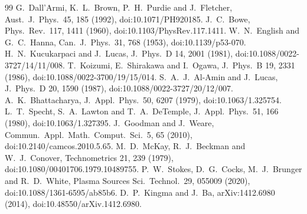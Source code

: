 \documentclass[11pt]{article}
\begin{document}
\begin{thebibliography}{99}
 G.~Dall'Armi, K.~L.~Brown, P.~H.~Purdie and J.~Fletcher, Aust.\ J.\ Phys.\ 45, 185 (1992), doi:10.1071/PH920185.
 J.~C.~Bowe, Phys.\ Rev.\ 117, 1411 (1960), doi:10.1103/PhysRev.117.1411.
 W.~N.~English and G.~C.~Hanna, Can.\ J.\ Phys.\ 31, 768 (1953), doi:10.1139/p53-070.
 H.~N.~Kucukarpaci and J.~Lucas, J.\ Phys.\ D 14, 2001 (1981), doi:10.1088/0022-3727/14/11/008.
 T.~Koizumi, E.~Shirakawa and I.~Ogawa, J.\ Phys.\ B 19, 2331 (1986), doi:10.1088/0022-3700/19/15/014.
 S.~A.~J.~Al-Amin and J.~Lucas, J.\ Phys.\ D 20, 1590 (1987), doi:10.1088/0022-3727/20/12/007.
 A.~K.~Bhattacharya, J.\ Appl.\ Phys.\ 50, 6207 (1979), doi:10.1063/1.325754.
 L.~T.~Specht, S.~A.~Lawton and T.~A.~DeTemple, J.\ Appl.\ Phys.\ 51, 166 (1980), doi:10.1063/1.327395.
 J.~Goodman and J.~Weare, Commun.\ Appl.\ Math.\ Comput.\ Sci.\ 5, 65 (2010), doi:10.2140/camcos.2010.5.65.
 M.~D.~McKay, R.~J.~Beckman and W.~J.~Conover, Technometrics 21, 239 (1979), doi:10.1080/00401706.1979.10489755.
 P.~W.~Stokes, D.~G.~Cocks, M.~J.~Brunger and R.~D.~White, Plasma Sources Sci.\ Technol.\ 29, 055009 (2020), doi:10.1088/1361-6595/ab85b6.
 D.~P.~Kingma and J.~Ba, arXiv:1412.6980 (2014), doi:10.48550/arXiv.1412.6980.
\end{thebibliography}
\end{document}
